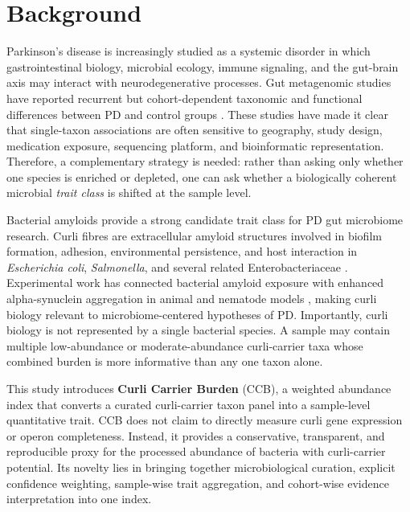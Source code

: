 \documentclass[11pt]{article}
\begin{document}
\begin{abstract}
\textbf{Conclusions:} CCB is a novel, extensible, microbiology-informed index for quantifying amyloidogenic curli-carrier bacterial burden in processed gut metagenomic profiles. The current results support CCB as a useful exploratory trait-level variable for PD microbiome research and provide a principled route toward future raw-read, csg-operon, strain-resolved, and phenotype-aware studies of the curli-vagal PD axis.
\end{abstract}

\section*{Background}

Parkinson's disease is increasingly studied as a systemic disorder in which gastrointestinal biology, microbial ecology, immune signaling, and the gut-brain axis may interact with neurodegenerative processes. Gut metagenomic studies have reported recurrent but cohort-dependent taxonomic and functional differences between PD and control groups \citep{romano2021,wallen2022,nishiwaki2024}. These studies have made it clear that single-taxon associations are often sensitive to geography, study design, medication exposure, sequencing platform, and bioinformatic representation. Therefore, a complementary strategy is needed: rather than asking only whether one species is enriched or depleted, one can ask whether a biologically coherent microbial \emph{trait class} is shifted at the sample level.

Bacterial amyloids provide a strong candidate trait class for PD gut microbiome research. Curli fibres are extracellular amyloid structures involved in biofilm formation, adhesion, environmental persistence, and host interaction in \emph{Escherichia coli}, \emph{Salmonella}, and several related Enterobacteriaceae \citep{barnhart2006}. Experimental work has connected bacterial amyloid exposure with enhanced alpha-synuclein aggregation in animal and nematode models \citep{chen2016}, making curli biology relevant to microbiome-centered hypotheses of PD. Importantly, curli biology is not represented by a single bacterial species. A sample may contain multiple low-abundance or moderate-abundance curli-carrier taxa whose combined burden is more informative than any one taxon alone.

This study introduces \textbf{Curli Carrier Burden} (CCB), a weighted abundance index that converts a curated curli-carrier taxon panel into a sample-level quantitative trait. CCB does not claim to directly measure curli gene expression or operon completeness. Instead, it provides a conservative, transparent, and reproducible proxy for the processed abundance of bacteria with curli-carrier potential. Its novelty lies in bringing together microbiological curation, explicit confidence weighting, sample-wise trait aggregation, and cohort-wise evidence interpretation into one index.
\end{document}
